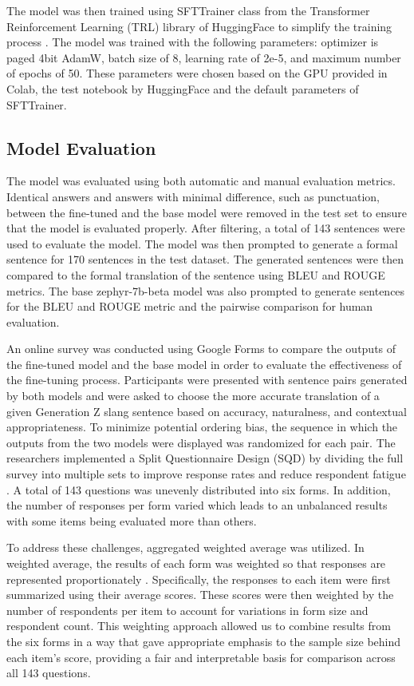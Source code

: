 The model was then trained using SFTTrainer class from the Transformer Reinforcement Learning (TRL) library of HuggingFace to simplify the training process \cite{vonwerra2022trl}. The model was trained with the following parameters: optimizer is paged 4bit AdamW, batch size of 8, learning rate of 2e-5, and maximum number of epochs of 50. These parameters were chosen based on the GPU provided in Colab, the test notebook by HuggingFace and the default parameters of SFTTrainer.

\subsection{Model Evaluation}
The model was evaluated using both automatic and manual evaluation metrics. Identical answers and answers with minimal difference, such as punctuation, between the fine-tuned and the base model were removed in the test set to ensure that the model is evaluated properly. After filtering, a total of 143 sentences were used to evaluate the model. The model was then prompted to generate a formal sentence for 170 sentences in the test dataset. The generated sentences were then compared to the formal translation of the sentence using BLEU and ROUGE metrics. The base zephyr-7b-beta model was also prompted to generate sentences for the BLEU and ROUGE metric and the pairwise comparison for human evaluation. 

An online survey was conducted using Google Forms to compare the outputs of the fine-tuned model and the base model in order to evaluate the effectiveness of the fine-tuning process. Participants were presented with sentence pairs generated by both models and were asked to choose the more accurate translation of a given Generation Z slang sentence based on accuracy, naturalness, and contextual appropriateness. To minimize potential ordering bias, the sequence in which the outputs from the two models were displayed was randomized for each pair. The researchers implemented a Split Questionnaire Design (SQD) by dividing the full survey into multiple sets to improve response rates and reduce respondent fatigue \cite{Peytchev_Peytcheva_2017}. A total of 143 questions was unevenly distributed into six forms. In addition, the number of responses per form varied which leads to an unbalanced results with some items being evaluated more than others.

To address these challenges, aggregated weighted average was utilized. In weighted average, the results of each form was weighted so that responses are represented proportionately \cite{Ganti_2024}. Specifically, the responses to each item were first summarized using their average scores. These scores were then weighted by the number of respondents per item to account for variations in form size and respondent count. This weighting approach allowed us to combine results from the six forms in a way that gave appropriate emphasis to the sample size behind each item’s score, providing a fair and interpretable basis for comparison across all 143 questions.

